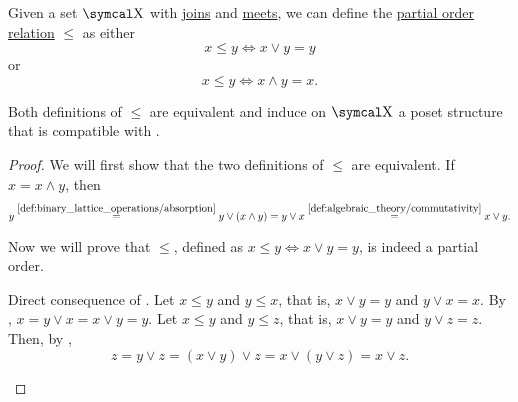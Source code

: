\begin{proposition}\label{thm:binary_lattice_operations_poset}
  Given a set \( \CX \) with \hyperref[def:binary_lattice_operations/join]{joins} and \hyperref[def:binary_lattice_operations/meet]{meets}, we can define the \hyperref[def:poset]{partial order relation} \( \leq \) as either
  \begin{equation*}
    x \leq y \iff x \vee y = y
  \end{equation*}
  or
  \begin{equation*}
    x \leq y \iff x \wedge y = x.
  \end{equation*}

  Both definitions of \( \leq \) are equivalent and induce on \( \CX \) a poset structure that is compatible with .
\end{proposition}
\begin{proof}
  We will first show that the two definitions of \( \leq \) are equivalent. If \( x = x \wedge y \), then
  \begin{equation*}
    y
    \overset {\ref{def:binary_lattice_operations/absorption}} =
    y \vee (x \wedge y)
    =
    y \vee x
    \overset {\ref{def:algebraic_theory/commutativity}} =
    x \vee y.
  \end{equation*}

  Now we will prove that \( \leq \), defined as \( x \leq y \iff x \vee y = y \), is indeed a partial order.
  \begin{description}
     Direct consequence of .
     Let \( x \leq y \) and \( y \leq x \), that is, \( x \vee y = y \) and \( y \vee x = x \). By , \( x = y \vee x = x \vee y = y \).
     Let \( x \leq y \) and \( y \leq z \), that is, \( x \vee y = y \) and \( y \vee z = z \). Then, by ,
    \begin{equation*}
      z = y \vee z = (x \vee y) \vee z = x \vee (y \vee z) = x \vee z.
    \end{equation*}
  \end{description}
\end{proof}

